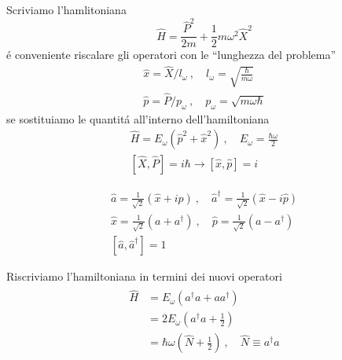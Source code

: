 \begin{multicols}{3}
  Scriviamo l'hamlitoniana
  \begin{equation*}
    \hat{H} = \frac{\hat{P}^2}{2m} + \frac{1}{2}m\omega^2\hat{X}^2
  \end{equation*}
  \'e conveniente riscalare gli operatori con le ``lunghezza del problema''
  \begin{equation}
    \label{eq:operatori-riscalati}
    \begin{gathered}
      \hat{x} = \hat{X} / l_{\omega} ~, \quad l_{\omega} = \sqrt{\frac{\hbar}{m\omega}} \\
      \hat{p} = \hat{P} / p_{\omega} ~, \quad p_{\omega} = \sqrt{m\omega\hbar}
    \end{gathered}
  \end{equation}
  se sostituiamo le quantit\'a all'interno dell'hamiltoniana
  \begin{equation}
    \label{eq:hamiltoniana-riscalata}
    \begin{gathered}
      \hat{H} = E_{\omega}(\hat{p}^2 + \hat{x}^2) ~, \quad E_{\omega} = \frac{\hbar\omega}{2} \\
      \left[\hat{X}, \hat{P}\right] = i\hbar \to \left[\hat{x}, \hat{p}\right] = i
    \end{gathered}
  \end{equation}

  \begin{equation}
    \begin{gathered}
      \hat{a} = \frac{1}{\sqrt{2}}\left(\hat{x} + i\hat{p}\right)
      ~, \quad
      \hat{a}^{\dagger} = \frac{1}{\sqrt{2}}\left(\hat{x} - i\hat{p}\right) \\
      \hat{x} = \frac{1}{\sqrt{2}}(a + a^{\dagger})
      ~, \quad
      \hat{p} = \frac{1}{\sqrt{2}}(a - a^{\dagger})\\
      [\hat{a}, \hat{a}^{\dagger}] = 1
    \end{gathered}
  \end{equation}

  Riscriviamo l'hamiltoniana in termini dei nuovi operatori
  \begin{align}
    \begin{split}
      \hat{H} &= E_{\omega}\left(a^{\dagger}a + aa^{\dagger}\right) \\
              &= 2E_{\omega}\left(a^{\dagger}a + \frac{1}{2}\right) \\
              &= \hbar\omega\left(\hat{N} + \frac{1}{2}\right)
                ~, \quad \hat{N} \equiv a^{\dagger}a
    \end{split}
  \end{align}


\end{multicols}
